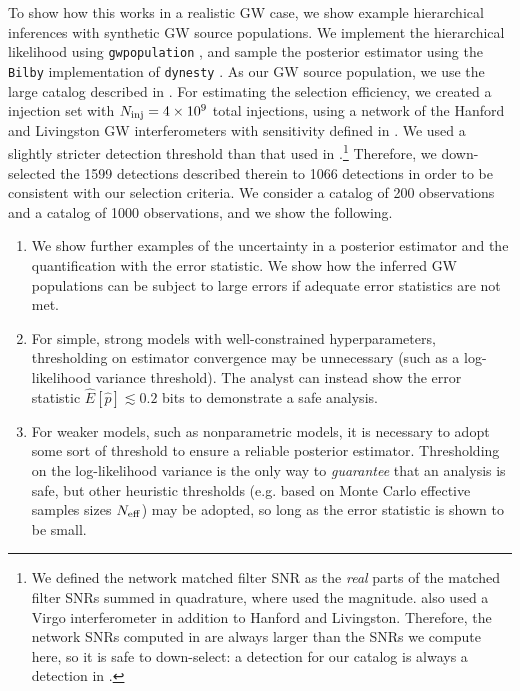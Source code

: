 To show how this works in a realistic \ac{GW} case, we show example hierarchical inferences with synthetic \ac{GW} source populations. We implement the hierarchical likelihood using \texttt{gwpopulation} \citep{Talbot:2019okv, Talbot:2024yqw}, and sample the posterior estimator using the \texttt{Bilby} \citep{Ashton:2018jfp} implementation of \texttt{dynesty} \citep{Speagle_2020}.
As our \ac{GW} source population, we use the large catalog described in \citet{Vitale:2025lms}. For estimating the selection efficiency, we created a injection set with $N_{\rm inj} = 4\times 10^9$ total injections, using a network of the Hanford and Livingston \ac{GW} interferometers with sensitivity defined in \citet{O4_psds}. We used a slightly stricter detection threshold than that used in \citet{Vitale:2025lms}.\footnote{We defined the network matched filter SNR as the \textit{real} parts of the matched filter SNRs summed in quadrature, where \citet{Vitale:2025lms} used the magnitude. \citet{Vitale:2025lms} also used a Virgo interferometer in addition to Hanford and Livingston. Therefore, the network SNRs computed in \citet{Vitale:2025lms} are always larger than the SNRs we compute here, so it is safe to down-select: a detection for our catalog is always a detection in \citet{Vitale:2025lms}.} Therefore, we down-selected the 1599 detections described therein to 1066 detections in order to be consistent with our selection criteria. We consider a catalog of 200 observations and a catalog of 1000 observations, and we show the following.

\begin{enumerate}
    \item We show further examples of the uncertainty in a posterior estimator and the quantification with the error statistic. We show how the inferred \ac{GW} populations can be subject to large errors if adequate error statistics are not met.
    \item For simple, strong models with well-constrained hyperparameters, thresholding on estimator convergence may be unnecessary (such as a log-likelihood variance threshold). The analyst can instead show the error statistic $\hat{E}[\hat{p}] \lesssim 0.2$ bits to demonstrate a safe analysis. 
    \item For weaker models, such as nonparametric models, it is necessary to adopt some sort of threshold to ensure a reliable posterior estimator. Thresholding on the log-likelihood variance is the only way to \textit{guarantee} that an analysis is safe, but other heuristic thresholds (e.g. based on Monte Carlo effective samples sizes $N_{\rm eff}$) may be adopted, so long as the error statistic is shown to be small.
\end{enumerate}

